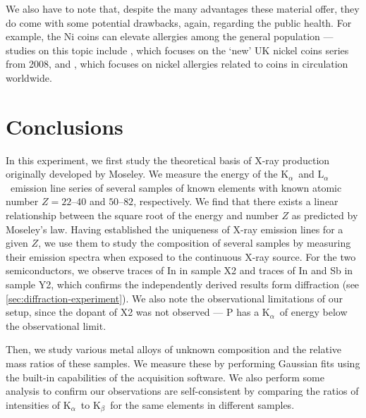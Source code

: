 \documentclass[11pt,a4paper,twoside,onecolumn]{article}
\newcommand{\reminder}[1]{\textcolor{red}{#1}}
\newcommand{\Kalpha}{$\mathrm{K}_\alpha$~}
\newcommand{\Kbeta}{$\mathrm{K}_\beta$~}
\newcommand{\Lalpha}{$\mathrm{L}_\alpha$~}
\begin{document}
We also have to note that, despite the many advantages these material offer, they do come with some potential drawbacks, again, regarding the public health. For example, the Ni coins can elevate allergies among the general population --- studies on this topic include \cite{Julander2013}, which focuses on the `new' UK nickel coins series from 2008, and \cite{Hamann2012}, which focuses on nickel allergies related to coins in circulation worldwide.



\section{Conclusions}
In this experiment, we first study the theoretical basis of X-ray production originally developed by Moseley. We measure the energy of the \Kalpha and \Lalpha emission line series of several samples of known elements with known atomic number $Z=\numrange{22}{40}$ and $\numrange{50}{82}$, respectively. We find that there exists a linear relationship between the square root of the energy and number $Z$ as predicted by Moseley's law. Having established the uniqueness of X-ray emission lines for a given $Z$, we use them to study the composition of several samples by measuring their emission spectra when exposed to the continuous X-ray source. For the two semiconductors, we observe traces of In in sample X2 and traces of In and Sb in sample Y2, which confirms the independently derived results form diffraction (see \ref{sec:diffraction-experiment}). We also note the observational limitations of our setup, since the dopant of X2 was not observed --- P has a \Kalpha of energy below the observational limit.

Then, we study various metal alloys of unknown composition and the relative mass ratios of these samples. We measure these by performing Gaussian fits using the built-in capabilities of the acquisition software. We also perform some analysis to confirm our observations are self-consistent by comparing the ratios of intensities of \Kalpha to \Kbeta for the same elements in different samples.
\end{document}
